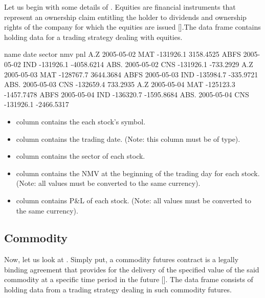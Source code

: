\documentclass[article]{jss}
\begin{document}
Let us begin with some details of . Equities are financial instruments that represent an ownership claim entitling the holder to dividends and ownership rights of the company for which the equities are issued [\cite{equities}].The  data frame contains holding data for a trading strategy dealing with equities. 


\begin{Schunk}
\begin{Soutput}
 name       date sector       nmv        pnl
  A.Z 2005-05-02    MAT -131926.1  3158.4525
 ABFS 2005-05-02    IND -131926.1 -4058.6214
 ABS. 2005-05-02    CNS -131926.1  -733.2929
  A.Z 2005-05-03    MAT -128767.7  3644.3684
 ABFS 2005-05-03    IND -135984.7  -335.9721
 ABS. 2005-05-03    CNS -132659.4   733.2935
  A.Z 2005-05-04    MAT -125123.3 -1457.7478
 ABFS 2005-05-04    IND -136320.7 -1595.8684
 ABS. 2005-05-04    CNS -131926.1 -2466.5317
\end{Soutput}
\end{Schunk}

\begin{itemize}
\item{ column contains the each stock's symbol.}
\item{ column contains the trading date. (Note: this column must be of   type)}.
\item{ column contains the sector of each stock.}
\item{ column contains the NMV at the beginning of the trading day for each stock. (Note: all values must be converted to the same currency). 
}
\item{ column contains P\&L of each stock. (Note: all values must be converted to the same currency). 
}
\end{itemize}

\subsection{Commodity}

\noindent
Now, let us look at . Simply put, a commodity futures contract is a legally binding agreement that provides for the delivery of the specified value of the said commodity at a specific time period in the future [\cite{futures}]. The  data frame consists of holding data from a trading strategy dealing in such commodity futures. 
\end{document}
